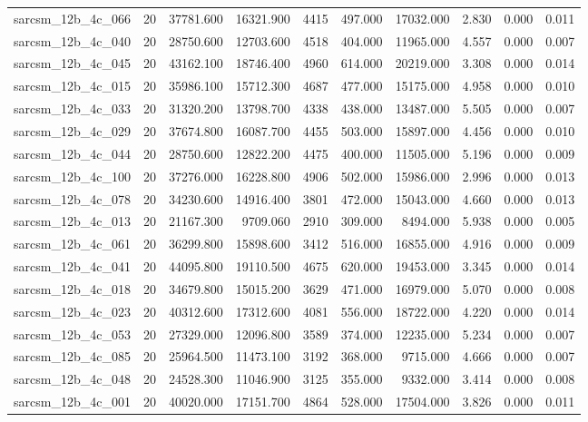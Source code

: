 \begin{tabular}{lrrrrrrrrr}
sarcsm\_12b\_4c\_066 & 20 & 37781.600 & 16321.900 & 4415 & 497.000 & 17032.000 & 2.830 & 0.000 & 0.011 \\
sarcsm\_12b\_4c\_040 & 20 & 28750.600 & 12703.600 & 4518 & 404.000 & 11965.000 & 4.557 & 0.000 & 0.007 \\
sarcsm\_12b\_4c\_045 & 20 & 43162.100 & 18746.400 & 4960 & 614.000 & 20219.000 & 3.308 & 0.000 & 0.014 \\
sarcsm\_12b\_4c\_015 & 20 & 35986.100 & 15712.300 & 4687 & 477.000 & 15175.000 & 4.958 & 0.000 & 0.010 \\
sarcsm\_12b\_4c\_033 & 20 & 31320.200 & 13798.700 & 4338 & 438.000 & 13487.000 & 5.505 & 0.000 & 0.007 \\
sarcsm\_12b\_4c\_029 & 20 & 37674.800 & 16087.700 & 4455 & 503.000 & 15897.000 & 4.456 & 0.000 & 0.010 \\
sarcsm\_12b\_4c\_044 & 20 & 28750.600 & 12822.200 & 4475 & 400.000 & 11505.000 & 5.196 & 0.000 & 0.009 \\
sarcsm\_12b\_4c\_100 & 20 & 37276.000 & 16228.800 & 4906 & 502.000 & 15986.000 & 2.996 & 0.000 & 0.013 \\
sarcsm\_12b\_4c\_078 & 20 & 34230.600 & 14916.400 & 3801 & 472.000 & 15043.000 & 4.660 & 0.000 & 0.013 \\
sarcsm\_12b\_4c\_013 & 20 & 21167.300 & 9709.060 & 2910 & 309.000 & 8494.000 & 5.938 & 0.000 & 0.005 \\
sarcsm\_12b\_4c\_061 & 20 & 36299.800 & 15898.600 & 3412 & 516.000 & 16855.000 & 4.916 & 0.000 & 0.009 \\
sarcsm\_12b\_4c\_041 & 20 & 44095.800 & 19110.500 & 4675 & 620.000 & 19453.000 & 3.345 & 0.000 & 0.014 \\
sarcsm\_12b\_4c\_018 & 20 & 34679.800 & 15015.200 & 3629 & 471.000 & 16979.000 & 5.070 & 0.000 & 0.008 \\
sarcsm\_12b\_4c\_023 & 20 & 40312.600 & 17312.600 & 4081 & 556.000 & 18722.000 & 4.220 & 0.000 & 0.014 \\
sarcsm\_12b\_4c\_053 & 20 & 27329.000 & 12096.800 & 3589 & 374.000 & 12235.000 & 5.234 & 0.000 & 0.007 \\
sarcsm\_12b\_4c\_085 & 20 & 25964.500 & 11473.100 & 3192 & 368.000 & 9715.000 & 4.666 & 0.000 & 0.007 \\
sarcsm\_12b\_4c\_048 & 20 & 24528.300 & 11046.900 & 3125 & 355.000 & 9332.000 & 3.414 & 0.000 & 0.008 \\
sarcsm\_12b\_4c\_001 & 20 & 40020.000 & 17151.700 & 4864 & 528.000 & 17504.000 & 3.826 & 0.000 & 0.011 \\

\end{tabular}
